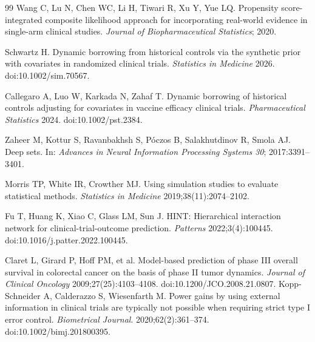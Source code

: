 \documentclass[11pt]{article}
\begin{document}
\begin{thebibliography}{99}
 Wang C, Lu N, Chen WC, Li H, Tiwari R, Xu Y, Yue LQ.
Propensity score-integrated composite likelihood approach for incorporating
real-world evidence in single-arm clinical studies. \emph{Journal of
Biopharmaceutical Statistics}; 2020.

 Schwartz H. Dynamic borrowing from historical controls via the
synthetic prior with covariates in randomized clinical trials.
\emph{Statistics in Medicine} 2026. doi:10.1002/sim.70567.

 Callegaro A, Luo W, Karkada N, Zahaf T. Dynamic borrowing of
historical controls adjusting for covariates in vaccine efficacy clinical
trials. \emph{Pharmaceutical Statistics} 2024. doi:10.1002/pst.2384.

 Zaheer M, Kottur S, Ravanbakhsh S, P\'oczos B, Salakhutdinov R,
Smola AJ. Deep sets. In: \emph{Advances in Neural Information Processing
Systems 30}; 2017:3391--3401.

 Morris TP, White IR, Crowther MJ. Using simulation studies to
evaluate statistical methods. \emph{Statistics in Medicine}
2019;38(11):2074--2102.

 Fu T, Huang K, Xiao C, Glass LM, Sun J. HINT: Hierarchical
interaction network for clinical-trial-outcome prediction. \emph{Patterns}
2022;3(4):100445. doi:10.1016/j.patter.2022.100445.

 Claret L, Girard P, Hoff PM, et al. Model-based prediction of
phase III overall survival in colorectal cancer on the basis of phase II tumor
dynamics. \emph{Journal of Clinical Oncology} 2009;27(25):4103--4108.
doi:10.1200/JCO.2008.21.0807.
 Kopp-Schneider A, Calderazzo S, Wiesenfarth M. Power gains by
using external information in clinical trials are typically not possible when
requiring strict type I error control. \emph{Biometrical Journal}.
2020;62(2):361--374. doi:10.1002/bimj.201800395.
\end{thebibliography}

\appendix
\end{document}

